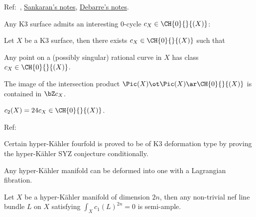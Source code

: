 \documentclass[a4paper, twoside]{article}
\begin{document}

Ref:~\cite{Huybrechts1999}, \href{https://people.bath.ac.uk/masgks/Papers/kinosaki19.pdf}{Sankaran's notes}, \href{https://www.math.ens.psl.eu/~debarre/HKmanifolds.pdf}{Debarre's notes}.


Any K3 surface admits an interesting $0$-cycle $c_{X}\in\CH{0}{}{(X)}$:
\begin{thm}[{\cite[Theorem~1]{BV2004}}]
	Let $X$ be a K3 surface, then there exists $c_{X}\in\CH{0}{}{(X)}$ such that
	\begin{enr}
		\item Any point on a (possibly singular) rational curve in $X$ has class $c_{X}\in\CH{0}{}{(X)}$.
		\item The image of the intersection product $\Pic(X)\ot\Pic(X)\ar\CH{0}{}{(X)}$ is contained in $\bZ c_{X}$.
		\item $c_{2}(X)=24c_{X}\in\CH{0}{}{(X)}$.
	\end{enr}
\end{thm}



Ref:~\cite{DHMV2024}

Certain hyper-K{\"a}hler fourfold is proved to be of K3\ts{[2]} deformation type by proving the hyper-K{\"a}hler SYZ conjecture conditionally.

\begin{cnj}
	Any hyper-K{\"a}hler manifold can be deformed into one with a Lagrangian fibration.
\end{cnj}

\begin{cnj}
	Let $X$ be a hyper-K{\"a}hler manifold of dimension $2n$, then any non-trivial nef line bundle $L$ on $X$ satisfying $\int_{X}c_{1}(L)^{2n}=0$ is semi-ample.
\end{cnj}


\printref
\end{document}
